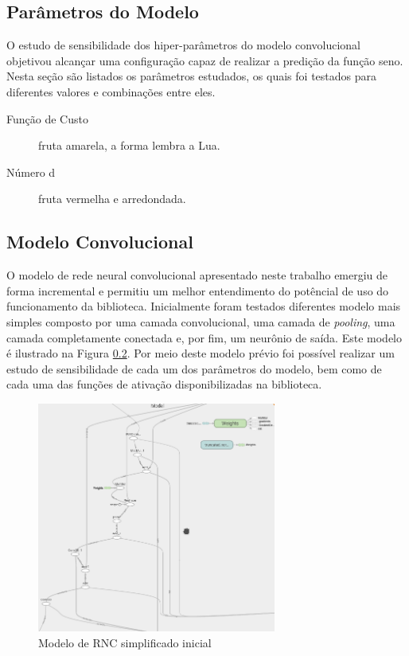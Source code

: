 \documentclass[a4paper,10pt]{report}
\begin{document}
\subsection{Parâmetros do Modelo}
O estudo de sensibilidade dos hiper-parâmetros do modelo convolucional objetivou 
alcançar uma configuração capaz de realizar a predição da função seno.
Nesta seção são listados os parâmetros estudados, os quais foi testados
para diferentes valores e combinações entre eles.

 \begin{description}
   \item[Função de Custo] fruta amarela, a forma lembra a Lua.
   \item[Número d] fruta vermelha e arredondada.
 \end{description}
  

\subsection{Modelo Convolucional}
O modelo de rede neural convolucional apresentado neste trabalho
emergiu de forma incremental e permitiu um melhor
entendimento do potêncial de uso do funcionamento da biblioteca.
Inicialmente foram testados diferentes modelo mais simples composto
por uma camada convolucional, uma camada de \textit{pooling},
uma camada completamente conectada e, por fim, um neurônio de saída.
Este modelo é ilustrado na Figura \ref{}. Por meio deste modelo
prévio foi possível realizar um estudo de sensibilidade de cada um
dos parâmetros do modelo, bem como de cada uma das funções de
ativação disponibilizadas na biblioteca.

\begin{figure}[htp]
\begin{center}
  \includegraphics[width=0.7\textwidth]{cnn_model}
  \caption{Modelo de RNC simplificado inicial}
  \label{fig:rncSimple}
\end{center}
\end{figure}
\end{document}
